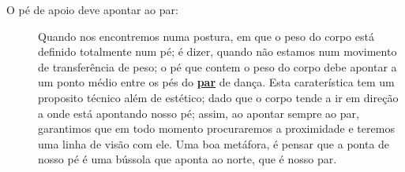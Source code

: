 \begin{description}
\item[O pé de apoio deve apontar ao par:] 
Quando nos encontremos numa postura, em que o peso do corpo está definido totalmente num pé;  
é dizer, quando não estamos num movimento de transferência de peso;
o pé que contem o peso do corpo debe apontar a um ponto médio entre os pés do \hyperref[def:Par]{\textbf{par}} de dança.
Esta caraterística tem um proposito técnico além de estético;
dado que o corpo tende a ir em direção a onde está apontando nosso pé;
assim, ao apontar sempre ao par, 
garantimos que em todo momento procuraremos a proximidade e teremos uma linha de visão  com ele.
Uma boa metáfora, é pensar que a ponta de nosso pé é uma bússola que aponta ao norte, que é nosso par.
\end{description}
